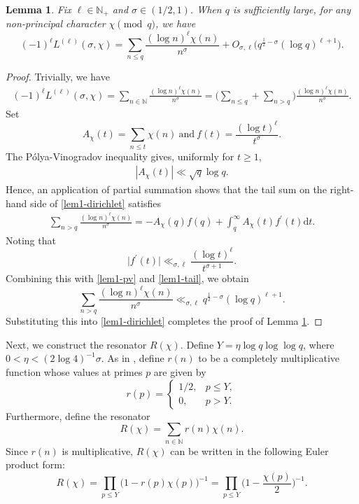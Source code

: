 \documentclass[12pt,reqno]{amsart}
\newtheorem{lem}[thm]{Lemma}
\theoremstyle{definition}
\numberwithin{equation}{section}
\newcommand{\bg}{\big}
\newcommand{\Bg}{\Big}
\newcommand{\inv}{^{-1}}
\newcommand{\mbn}{\mathbb{N}}
\newcommand{\mmd}{\mathrm{d}}
\begin{document}
\begin{lem}
\label{lem1}
    Fix \(\ell \in \mbn_+\) and \(\sigma \in (1/2,1)\). When \(q\) is sufficiently large, for any non-principal character \(\chi\pmod {q}\), we have
    \[
    (-1)^\ell  L^{(\ell)}(\sigma,\chi) = \sum_{n \le q}\frac{(\log n )^\ell \chi(n)}{n^\sigma} + O_{\sigma,\ell} \bg( q^{\frac{1}{2}-\sigma}(\log q)^{\ell+1}\bg).
    \]
\end{lem}
\begin{proof}
    Trivially, we have
\begin{align}
    \label{lem1-dirichlet}
    (-1)^\ell  L^{(\ell)}(\sigma,\chi) = \sum_{n\in \mbn} \frac{(\log n )^\ell \chi(n)}{n^\sigma} = \Bg(\sum_{n \le q} +\sum_{n > q}\Bg) \frac{(\log n )^\ell \chi(n)}{n^\sigma}.
\end{align}
Set
\[
A_\chi (t) = \sum_{n \le t} \chi(n) ~\text{and}~ f(t) = \frac{(\log t)^\ell}{t^\sigma}.
\]
The P\'olya-Vinogradov inequality gives, uniformly for \(t \ge 1\), 
\begin{align}
    \label{lem1-pv}
    |A_\chi (t)| \ll \sqrt{q}\log q.
\end{align}
Hence, an application of partial summation shows that the tail sum on the right-hand side of \eqref{lem1-dirichlet} satisfies
\begin{align}
    \label{lem1-tail}
    \sum_{n > q}\frac{(\log n )^\ell \chi(n)}{n^\sigma} = -A_\chi (q) f(q) + \int_{q}^\infty A_\chi(t) f^\prime (t) \mmd t. 
\end{align}
Noting that
\[
\bg|f^\prime(t)\bg| \ll_{\sigma,\ell} \frac{(\log t)^\ell}{t^{\sigma+1}}.
\]
Combining this with \eqref{lem1-pv} and \eqref{lem1-tail}, we obtain
\[
\sum_{n > q}\frac{(\log n )^\ell \chi(n)}{n^\sigma} \ll_{\sigma,\ell} q^{\frac{1}{2}-\sigma}(\log q)^{\ell+1}.
\]
Substituting this into \eqref{lem1-dirichlet} completes the proof of Lemma \ref{lem1}.
\end{proof}

\par
Next, we construct the resonator \(R(\chi)\). Define \(Y= \eta \log q \log\log q\), where \(0 < \eta < (2\log 4)\inv \sigma\). As in \cite{Aistleitner2019QJMath}, define \(r(n)\) to be a completely multiplicative function whose values at primes \(p\) are given by
	\[
	r(p)=
	\begin{cases}
		1/2, & p\leq Y,\\
		0, & p>Y.
	\end{cases}
	\]
Furthermore, define the resonator
\[
R(\chi) = \sum_{n \in \mbn}r(n)\chi(n).
\]
Since \(r(n)\) is multiplicative, \(R(\chi)\) can be written in the following Euler product form:
\[
R(\chi) = \prod_{p \le Y} \bg(1-r(p)\chi(p) \bg)\inv = \prod_{p \le Y} \Bg(1-\frac{\chi(p)}{2} \Bg)\inv.
\]
\end{document}

